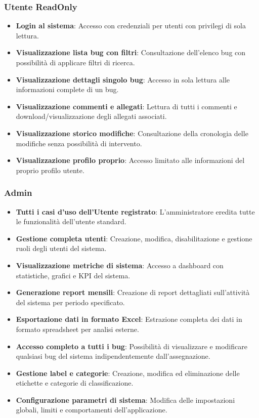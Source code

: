 \subsubsection{Utente ReadOnly}
\begin{itemize}
    \item \textbf{Login al sistema}: Accesso con credenziali per utenti con privilegi di sola lettura.
    \item \textbf{Visualizzazione lista bug con filtri}: Consultazione dell'elenco bug con possibilità di applicare filtri di ricerca.
    \item \textbf{Visualizzazione dettagli singolo bug}: Accesso in sola lettura alle informazioni complete di un bug.
    \item \textbf{Visualizzazione commenti e allegati}: Lettura di tutti i commenti e download/visualizzazione degli allegati associati.
    \item \textbf{Visualizzazione storico modifiche}: Consultazione della cronologia delle modifiche senza possibilità di intervento.
    \item \textbf{Visualizzazione profilo proprio}: Accesso limitato alle informazioni del proprio profilo utente.
\end{itemize}

\subsubsection{Admin}
\begin{itemize}
    \item \textbf{Tutti i casi d'uso dell'Utente registrato}: L'amministratore eredita tutte le funzionalità dell'utente standard.
    \item \textbf{Gestione completa utenti}: Creazione, modifica, disabilitazione e gestione ruoli degli utenti del sistema.
    \item \textbf{Visualizzazione metriche di sistema}: Accesso a dashboard con statistiche, grafici e KPI del sistema.
    \item \textbf{Generazione report mensili}: Creazione di report dettagliati sull'attività del sistema per periodo specificato.
    \item \textbf{Esportazione dati in formato Excel}: Estrazione completa dei dati in formato spreadsheet per analisi esterne.
    \item \textbf{Accesso completo a tutti i bug}: Possibilità di visualizzare e modificare qualsiasi bug del sistema indipendentemente dall'assegnazione.
    \item \textbf{Gestione label e categorie}: Creazione, modifica ed eliminazione delle etichette e categorie di classificazione.
    \item \textbf{Configurazione parametri di sistema}: Modifica delle impostazioni globali, limiti e comportamenti dell'applicazione.
\end{itemize}


